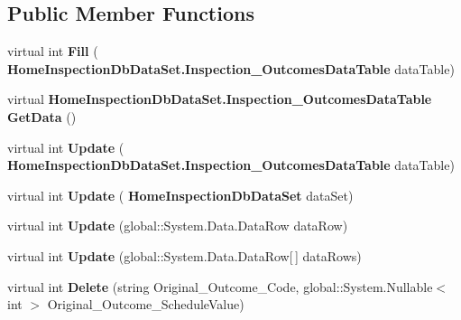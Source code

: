 \subsection*{Public Member Functions}
\begin{DoxyCompactItemize}
\item 
\mbox{\label{class_a_f_h___scheduler_1_1_home_inspection_db_data_set_table_adapters_1_1_inspection___outcomes_table_adapter_a0c3906e5b13627c9206ae70ae3b1920c}} 
virtual int {\bfseries Fill} (\textbf{ Home\+Inspection\+Db\+Data\+Set.\+Inspection\+\_\+\+Outcomes\+Data\+Table} data\+Table)
\item 
\mbox{\label{class_a_f_h___scheduler_1_1_home_inspection_db_data_set_table_adapters_1_1_inspection___outcomes_table_adapter_a786acd8e0cbf2e2c8355bef677bc09fa}} 
virtual \textbf{ Home\+Inspection\+Db\+Data\+Set.\+Inspection\+\_\+\+Outcomes\+Data\+Table} {\bfseries Get\+Data} ()
\item 
\mbox{\label{class_a_f_h___scheduler_1_1_home_inspection_db_data_set_table_adapters_1_1_inspection___outcomes_table_adapter_a72ac7bd26f2a6b2e94f89eda07cd60b4}} 
virtual int {\bfseries Update} (\textbf{ Home\+Inspection\+Db\+Data\+Set.\+Inspection\+\_\+\+Outcomes\+Data\+Table} data\+Table)
\item 
\mbox{\label{class_a_f_h___scheduler_1_1_home_inspection_db_data_set_table_adapters_1_1_inspection___outcomes_table_adapter_ac52cf2bdc4d68a770f0d9e0300c4f8ad}} 
virtual int {\bfseries Update} (\textbf{ Home\+Inspection\+Db\+Data\+Set} data\+Set)
\item 
\mbox{\label{class_a_f_h___scheduler_1_1_home_inspection_db_data_set_table_adapters_1_1_inspection___outcomes_table_adapter_a1b6f05d4879cdf911b42a2397c014161}} 
virtual int {\bfseries Update} (global\+::\+System.\+Data.\+Data\+Row data\+Row)
\item 
\mbox{\label{class_a_f_h___scheduler_1_1_home_inspection_db_data_set_table_adapters_1_1_inspection___outcomes_table_adapter_a7ccec7d33c6052153833589b2620325a}} 
virtual int {\bfseries Update} (global\+::\+System.\+Data.\+Data\+Row[$\,$] data\+Rows)
\item 
\mbox{\label{class_a_f_h___scheduler_1_1_home_inspection_db_data_set_table_adapters_1_1_inspection___outcomes_table_adapter_a8715f76a5cc37389a8bc0c7c94069043}} 
virtual int {\bfseries Delete} (string Original\+\_\+\+Outcome\+\_\+\+Code, global\+::\+System.\+Nullable$<$ int $>$ Original\+\_\+\+Outcome\+\_\+\+Schedule\+Value)
\item 
\mbox{\label{class_a_f_h___scheduler_1_1_home_inspection_db_data_set_table_adapters_1_1_inspection___outcomes_table_adapter_ae4b436430d13f101da9c806f1029a4b0}} 

\end{DoxyCompactItemize}
